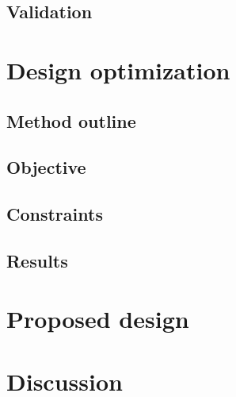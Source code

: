     \subsection{Validation}                     \label{Chapter:PMLSM design HM/electromagnetic model/Validation}


\section{Design optimization}                   \label{Chapter:PMLSM design HM/design optimization}
    \subsection{Method outline}                 \label{Chapter:PMLSM design HM/design optimization/method outline}
    \subsection{Objective}                      \label{Chapter:PMLSM design HM/design optimization/objectives}
    \subsection{Constraints}                    \label{Chapter:PMLSM design HM/design optimization/constraints}
    \subsection{Results}                        \label{Chapter:PMLSM design HM/design optimization/results}


\section{Proposed design}                       \label{Chapter:PMLSM design HM/proposed design}


\section{Discussion}                            \label{Chapter:PMLSM design HM/discussion}